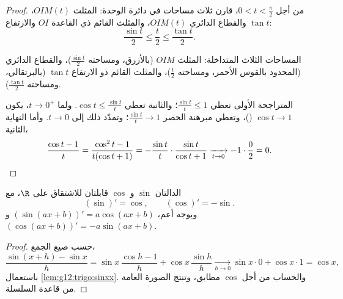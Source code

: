 \begin{proof}
من أجل $0 < t < \frac{\pi}{2}$، قارن ثلاث مساحات في دائرة الوحدة:
المثلث $OIM(t)$، والقطاع الدائري $OIM(t)$، والمثلث القائم ذي
القاعدة $OI$ والارتفاع $\tan t$:
\[
\frac{\sin t}{2} \leq \frac{t}{2} \leq \frac{\tan t}{2}.
\]

\begin{omfigure}

{\small المساحات الثلاث المتداخلة: المثلث $OIM$ (بالأزرق، ومساحته
$\frac{\sin t}{2}$)، والقطاع الدائري (المحدود بالقوس الأحمر، ومساحته
$\frac{t}{2}$)، والمثلث القائم ذو الارتفاع $\tan t$ (بالبرتقالي، ومساحته
$\frac{\tan t}{2}$).}
\end{omfigure}

المتراجحة الأولى تعطي $\frac{\sin t}{t} \leq 1$؛ والثانية تعطي
$\cos t \leq \frac{\sin t}{t}$. ولما $t \to 0^+$، يكون $\cos t \to 1$ ()،
وتعطي مبرهنة الحصر $\frac{\sin t}{t} \to 1$؛ وتمدّد  ذلك
إلى $t \to 0$. وأما النهاية الثانية،
\[
\frac{\cos t - 1}{t} = \frac{\cos^2 t - 1}{t(\cos t + 1)}
= -\frac{\sin t}{t}\cdot\frac{\sin t}{\cos t + 1}
\xrightarrow[t\to0]{} -1 \cdot \frac{0}{2} = 0. \qedhere
\]
\end{proof}

\begin{theorem}\label{thm:g12:trigo:derivatives}
الدالتان $\sin$ و $\cos$ قابلتان للاشتقاق على $\R$، مع
\[
(\sin)' = \cos, \qquad (\cos)' = -\sin .
\]
وبوجه أعم، $(\sin(ax+b))' = a\cos(ax+b)$ و
$(\cos(ax+b))' = -a\sin(ax+b)$.
\end{theorem}

\begin{proof}
حسب صيغ الجمع،
\[
\frac{\sin(x+h) - \sin x}{h}
= \sin x\,\frac{\cos h - 1}{h} + \cos x\,\frac{\sin h}{h}
\xrightarrow[h\to0]{} \sin x \cdot 0 + \cos x \cdot 1 = \cos x,
\]
باستعمال \cref{lem:g12:trigo:sinxx}. والحساب من أجل $\cos$ مطابق،
وتنتج الصورة العامة من قاعدة السلسلة.
\end{proof}

